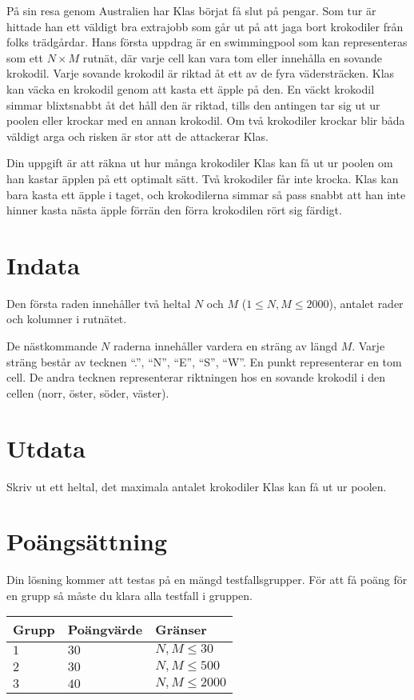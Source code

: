 
På sin resa genom Australien har Klas börjat få slut på pengar. Som tur är hittade han ett 
väldigt bra extrajobb som går ut på att jaga bort krokodiler från folks trädgårdar. Hans första 
uppdrag är en swimmingpool som kan representeras som ett $N \times M$ rutnät, där varje cell kan vara 
tom eller innehålla en sovande krokodil. Varje sovande krokodil är riktad åt ett av de fyra
vädersträcken. Klas kan väcka en krokodil genom att kasta ett äpple på den. En väckt krokodil simmar  
blixtsnabbt åt det håll den är riktad, tills den antingen tar sig ut ur poolen eller 
krockar med en annan krokodil. Om två krokodiler krockar blir båda väldigt arga och risken är stor att 
de attackerar Klas.

Din uppgift är att räkna ut hur många krokodiler Klas kan få ut ur poolen om han kastar äpplen på 
ett optimalt sätt. Två krokodiler får inte krocka. Klas kan bara kasta ett äpple i taget, och krokodilerna 
simmar så pass snabbt att han inte hinner kasta nästa äpple förrän den förra krokodilen rört sig färdigt.


\section*{Indata}
Den första raden innehåller två heltal $N$ och $M$ ($1 \leq N,M \leq 2000$), antalet rader och kolumner
i rutnätet.

De nästkommande $N$ raderna innehåller vardera en sträng av längd $M$. Varje sträng består av tecknen 
``.'', ``N'', ``E'', ``S'', ``W''. En punkt representerar en tom cell. De andra tecknen representerar  
riktningen hos en sovande krokodil i den cellen (norr, öster, söder, väster). 


\section*{Utdata}
Skriv ut ett heltal, det maximala antalet krokodiler Klas kan få ut ur poolen.

\section*{Poängsättning}
Din lösning kommer att testas på en mängd testfallsgrupper.
För att få poäng för en grupp så måste du klara alla testfall i gruppen.

\noindent
\begin{tabular}{| l | l | l |}
  \hline
  Grupp & Poängvärde & Gränser \\ \hline
  $1$    & $30$        &  $N, M \leq 30$ \\ \hline
  $2$    & $30$        &  $N, M \leq 500$ \\ \hline
  $3$    & $40$        &  $N, M \leq 2000$ \\ \hline
\end{tabular}

